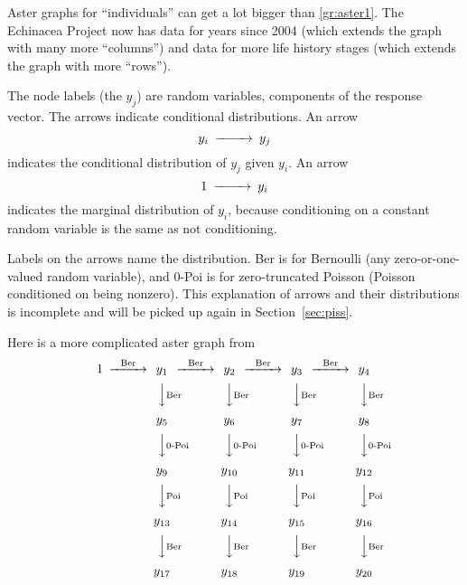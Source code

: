 Aster graphs for ``individuals'' can get a lot bigger than \eqref{gr:aster1}.
The Echinacea Project now has data for years since 2004 (which extends
the graph with many more ``columns'') and data for more life history
stages (which extends the graph with more ``rows'').

The node labels (the $y_j$) are random variables, components of the response
vector.  The arrows indicate conditional distributions.
An arrow
\begin{equation} \label{gr:one-arrow-conditional}
\begin{CD}
   y_i @>>> y_j
\end{CD}
\end{equation}
indicates the conditional distribution of $y_j$ given $y_i$.
An arrow
\begin{equation} \label{gr:one-arrow-marginal}
\begin{CD}
   1 @>>> y_i
\end{CD}
\end{equation}
indicates the marginal distribution of $y_i$,
because conditioning on a constant random variable is the same as not
conditioning.

Labels on the arrows name the distribution.
Ber is for Bernoulli (any zero-or-one-valued random variable), and
0-Poi is for zero-truncated Poisson (Poisson conditioned on being nonzero).
This explanation of arrows and their distributions is incomplete and will
be picked up again in Section~\ref{sec:piss}.

Here is a more complicated aster graph from \citet{aster3}
\begin{equation} \label{gr:aster3}
\begin{CD}
   1
   @>\text{Ber}>>
   y_1
   @>\text{Ber}>>
   y_2
   @>\text{Ber}>>
   y_3
   @>\text{Ber}>>
   y_4
   \\
   @.
   @VV\text{Ber}V
   @VV\text{Ber}V
   @VV\text{Ber}V
   @VV\text{Ber}V
   \\
   \hphantom{1}
   @.
   y_5
   @.
   y_6
   @.
   y_7
   @.
   y_8
   \\
   @.
   @VV\text{0-Poi}V
   @VV\text{0-Poi}V
   @VV\text{0-Poi}V
   @VV\text{0-Poi}V
   \\
   \hphantom{1}
   @.
   y_9
   @.
   y_{10}
   @.
   y_{11}
   @.
   y_{12}
   \\
   @.
   @VV\text{Poi}V
   @VV\text{Poi}V
   @VV\text{Poi}V
   @VV\text{Poi}V
   \\
   \hphantom{1}
   @.
   y_{13}
   @.
   y_{14}
   @.
   y_{15}
   @.
   y_{16}
   \\
   @.
   @VV\text{Ber}V
   @VV\text{Ber}V
   @VV\text{Ber}V
   @VV\text{Ber}V
   \\
   \hphantom{1}
   @.
   y_{17}
   @.
   y_{18}
   @.
   y_{19}
   @.
   y_{20}
\end{CD}
\end{equation}

